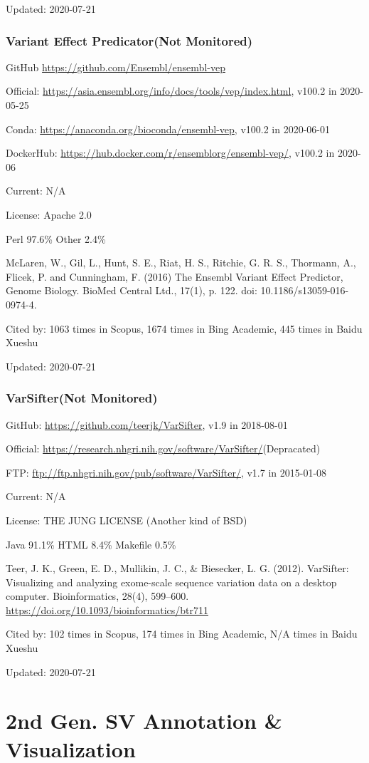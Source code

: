 \documentclass[]{article}
\newcommand{\nm}{{\color{red}(Not Monitored)}}
\newcommand{\de}{{\color{red}(Depracated)}}
\newcommand{\cb}[3]{\par Cited by: {\color{blue}\Huge #1} times in Scopus, {\color{blue}\Huge #2} times in Bing Academic, {\color{blue}\Huge #3} times in Baidu Xueshu}
\begin{document}
Updated: 2020-07-21

\section{Variant Effect Predicator\nm}

GitHub \url{https://github.com/Ensembl/ensembl-vep}

Official: \url{https://asia.ensembl.org/info/docs/tools/vep/index.html}, v100.2 in 2020-05-25

Conda: \url{https://anaconda.org/bioconda/ensembl-vep}, v100.2 in 2020-06-01

DockerHub: \url{https://hub.docker.com/r/ensemblorg/ensembl-vep/}, v100.2 in 2020-06

Current: N/A

License: Apache 2.0

Perl 97.6\% Other 2.4\%

McLaren, W., Gil, L., Hunt, S. E., Riat, H. S., Ritchie, G. R. S., Thormann, A., Flicek, P. and Cunningham, F. (2016) The Ensembl Variant Effect Predictor, Genome Biology. BioMed Central Ltd., 17(1), p. 122. doi: 10.1186/s13059-016-0974-4.\cb{1063}{1674}{445}

Updated: 2020-07-21

\section{VarSifter\nm}

GitHub: \url{https://github.com/teerjk/VarSifter}, v1.9 in 2018-08-01

Official: \url{https://research.nhgri.nih.gov/software/VarSifter/}\de

FTP: \url{ftp://ftp.nhgri.nih.gov/pub/software/VarSifter/}, v1.7 in 2015-01-08

Current: N/A

License: THE JUNG LICENSE (Another kind of BSD)

Java 91.1\% HTML 8.4\% Makefile 0.5\%

Teer, J. K., Green, E. D., Mullikin, J. C., \& Biesecker, L. G. (2012). VarSifter: Visualizing and analyzing exome-scale sequence variation data on a desktop computer. Bioinformatics, 28(4), 599–600. \url{https://doi.org/10.1093/bioinformatics/btr711}\cb{102}{174}{N/A}

Updated: 2020-07-21

\part{2nd Gen. SV Annotation \& Visualization}
\end{document}
